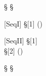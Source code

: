 \def\RuleCmdPrefix{RuleSLocal}
\def\RuleNamePrefix{TL-}

 {
  \neg \SNonLocal \S
} {
  \SLocal \S
}

 {} {
  \SNonLocal \SAcq
}

 [SeqI] {\SNonLocal \S[1]} {
  \SNonLocal (\SSeq{\S[1]}{\S[2]})
}

 [SeqII] {
  \S[1] \SEq \SSkip \\
  \SNonLocal \S[2]
} {
  \SNonLocal (\SSeq{\S[1]}{\S[2]})
}

 {
  \SNonLocal \S
} {
  \SNonLocal \SRec\SVar\S
}
